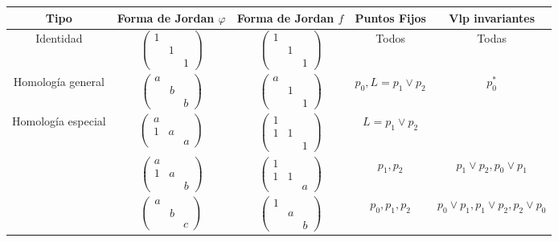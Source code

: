 \documentclass{myclass}
\begin{document}
\begin{center}
\begin{tabular}{|c|c|c|c|c|}
\hline
Tipo & Forma de Jordan $\varphi $ & Forma de Jordan $f$ & Puntos Fijos & Vlp invariantes \\
\hline
Identidad & $\begin{pmatrix} 1 & & \\ & 1 & \\ & & 1 \end{pmatrix}$ & $\begin{pmatrix} 1 & & \\ & 1 & \\ & & 1 \end{pmatrix} $ & Todos & Todas \\
	 \hline
Homología general	 & $\begin{pmatrix} a & & \\ & b & \\  & & b \end{pmatrix} $ & $\begin{pmatrix} a & & \\ & 1 & \\  & & 1 \end{pmatrix} $ & $p_0, L = p_1\lor p_2$ & $p_0^*$ \\
	 \hline
Homología especial	 & $\begin{pmatrix} a & & \\ 1 & a & \\  & & a \end{pmatrix} $ & $\begin{pmatrix} 1 & & \\ 1 & 1 & \\  & & 1 \end{pmatrix} $ & $L = p_1\lor p_2$ & \\
\hline
					 & $\begin{pmatrix} a & & \\ 1 & a& \\  & & b \end{pmatrix} $ & $\begin{pmatrix} 1 & & \\ 1 & 1 & \\  & & a \end{pmatrix} $ & $p_1, p_2$ & $p_1\lor p_2, p_0\lor p_1$   \\
\hline
					 &  $\begin{pmatrix} a & & \\  & b & \\  & & c \end{pmatrix} $ & $\begin{pmatrix} 1 & & \\  & a & \\  & & b \end{pmatrix} $ & $p_0, p_1, p_2$ & $p_0\lor p_1, p_1\lor p_2, p_2\lor p_0$ \\

\end{tabular}
\end{center}
\end{document}
